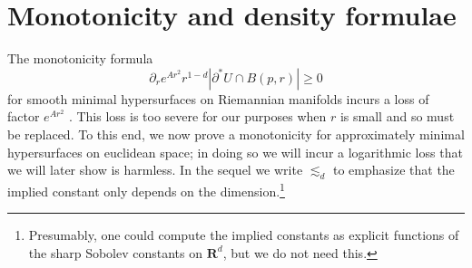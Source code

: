 \documentclass[reqno,12pt,letterpaper]{amsart}
\newcommand{\RR}{\mathbf{R}}
\newcommand{\normal}{\mathbf n}
\theoremstyle{definition}
\numberwithin{equation}{section}
\begin{document}
%

\section{Monotonicity and density formulae}\label{inequalities}
The monotonicity formula
\begin{equation}\label{classic monotonicity formula}
\partial_r e^{Ar^2}r^{1 - d} |\partial^* U \cap B(p, r)| \geq 0
\end{equation}
for smooth minimal hypersurfaces on Riemannian manifolds incurs a loss of factor $e^{Ar^2}$ \cite[\S7]{MarquesXX}.
This loss is too severe for our purposes when $r$ is small and so must be replaced.
To this end, we now prove a monotonicity for approximately minimal hypersurfaces on euclidean space; in doing so we will incur a logarithmic loss that we will later show is harmless.
In the sequel we write $\lesssim_d$ to emphasize that the implied constant only depends on the dimension.\footnote{Presumably, one could compute the implied constants as explicit functions of the sharp Sobolev constants on $\RR^d$, but we do not need this.}
\end{document}
